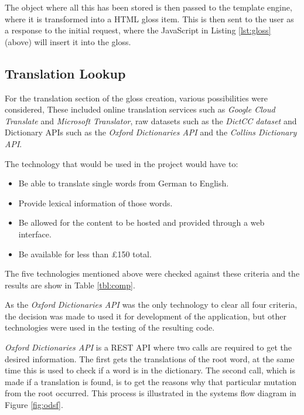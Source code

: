 The object where all this has been stored is then passed to the template engine, where it is transformed into a HTML gloss item. This is then sent to the user as a response to the initial request, where the JavaScript in Listing \ref{lst:gloss} (above) will insert it into the gloss. 

\subsection{Translation Lookup}

For the translation section of the gloss creation, various possibilities were considered, These included online translation services such as \textit{Google Cloud Translate} and \textit{Microsoft Translator}, raw datasets such as the \textit{DictCC dataset} and Dictionary APIs such as the \textit{Oxford Dictionaries API} and the \textit{Collins Dictionary API}. 

The technology that would be used in the project would have to:
\begin{itemize}
\item Be able to translate single words from German to English.
\item Provide lexical information of those words.
\item Be allowed for the content to be hosted and provided through a web interface.
\item Be available for less than \pounds150 total.
\end{itemize}

The five technologies mentioned above were checked against these criteria and the results are show in Table \ref{tbl:comp}.



As the \textit{Oxford Dictionaries API} was the only technology to clear all four criteria, the decision was made to used it for development of the application, but other technologies were used in the testing of the resulting code.

\textit{Oxford Dictionaries API} is a REST API where two calls are required to get the desired information. The first gets the translations of the root word, at the same time this is used to check if a word is in the dictionary. The second call, which is made if a translation is found, is to get the reasons why that particular mutation from the root occurred. This process is illustrated in the systems flow diagram in Figure \ref{fig:odsf}.



